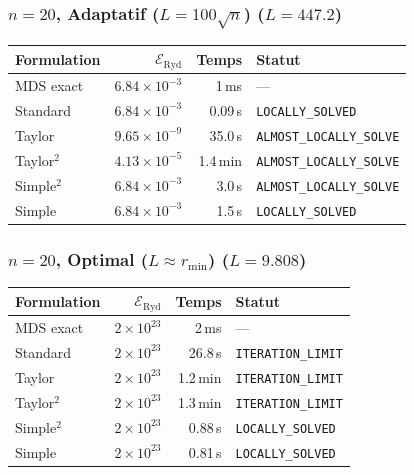 \subsubsection{$n=20$, Adaptatif ($L{=}100\sqrt{n}$) ($L=447.2$)}
\begin{longtable}{@{}lrrl@{}}
  \toprule
  Formulation & $\mathcal{E}_{\mathrm{Ryd}}$ & Temps & Statut \\
  \midrule
  \endhead
  MDS exact & $6.84\times10^{-3}$ & 1\,ms & --- \\
  Standard & $6.84\times10^{-3}$ & 0.09\,s & \texttt{LOCALLY\_SOLVED} \\
  Taylor & $9.65\times10^{-9}$ & 35.0\,s & \texttt{ALMOST\_LOCALLY\_SOLVE} \\
  Taylor$^2$ & $4.13\times10^{-5}$ & 1.4\,min & \texttt{ALMOST\_LOCALLY\_SOLVE} \\
  Simple$^2$ & $6.84\times10^{-3}$ & 3.0\,s & \texttt{ALMOST\_LOCALLY\_SOLVE} \\
  Simple & $6.84\times10^{-3}$ & 1.5\,s & \texttt{LOCALLY\_SOLVED} \\
  \bottomrule
\end{longtable}

\subsubsection{$n=20$, Optimal ($L{\approx}r_{\min}$) ($L=9.808$)}
\begin{longtable}{@{}lrrl@{}}
  \toprule
  Formulation & $\mathcal{E}_{\mathrm{Ryd}}$ & Temps & Statut \\
  \midrule
  \endhead
  MDS exact & $2\times10^{23}$ & 2\,ms & --- \\
  Standard & $2\times10^{23}$ & 26.8\,s & \texttt{ITERATION\_LIMIT} \\
  Taylor & $2\times10^{23}$ & 1.2\,min & \texttt{ITERATION\_LIMIT} \\
  Taylor$^2$ & $2\times10^{23}$ & 1.3\,min & \texttt{ITERATION\_LIMIT} \\
  Simple$^2$ & $2\times10^{23}$ & 0.88\,s & \texttt{LOCALLY\_SOLVED} \\
  Simple & $2\times10^{23}$ & 0.81\,s & \texttt{LOCALLY\_SOLVED} \\
  \bottomrule
\end{longtable}

